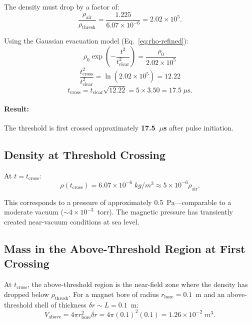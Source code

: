 \documentclass[amsmath,amssymb,aps,prd,superscriptaddress,nofootinbib]{revtex4-2}
\begin{document}
The density must drop by a factor of:
\begin{equation}
\frac{\rho_\text{air}}{\rho_\text{thresh}} = \frac{1.225}{6.07 \times 10^{-6}}
= 2.02 \times 10^{5}.
\end{equation}

Using the Gaussian evacuation model (Eq.~\ref{eq:rho-refined}):
\begin{equation}
\rho_0 \exp\!\left(-\frac{t^2}{t_\text{clear}^2}\right) = \frac{\rho_0}{2.02 \times 10^5}
\end{equation}
\begin{equation}
\frac{t_\text{cross}^2}{t_\text{clear}^2} = \ln(2.02 \times 10^5) = 12.22
\end{equation}
\begin{equation}\label{eq:t-cross}
\boxed{
t_\text{cross} = t_\text{clear}\sqrt{12.22}
= 5 \times 3.50 = 17.5 \; \mu\text{s}.
}
\end{equation}

\paragraph{Result:} The threshold is first crossed approximately
\textbf{17.5~$\mu$s} after pulse initiation.

\subsection{Density at Threshold Crossing}

At $t = t_\text{cross}$:
\begin{equation}
\rho(t_\text{cross}) = 6.07 \times 10^{-6} \; \si{kg/m^3}
\approx 5 \times 10^{-6} \rho_\text{air}.
\end{equation}

This corresponds to a pressure of approximately 0.5~Pa---comparable to
a moderate vacuum ($\sim 4 \times 10^{-3}$~torr). The magnetic pressure
has transiently created near-vacuum conditions at sea level.

\subsection{Mass in the Above-Threshold Region at First Crossing}

At $t_\text{cross}$, the above-threshold region is the near-field zone
where the density has dropped below $\rho_\text{thresh}$. For a
magnet bore of radius $r_\text{bore} = 0.1$~m and an above-threshold
shell of thickness $\delta r \sim L = 0.1$~m:
\begin{equation}
V_\text{above} = 4\pi r_\text{bore}^2 \delta r
= 4\pi (0.1)^2 (0.1) = 1.26 \times 10^{-2} \; \si{m^3}.
\end{equation}
\end{document}
